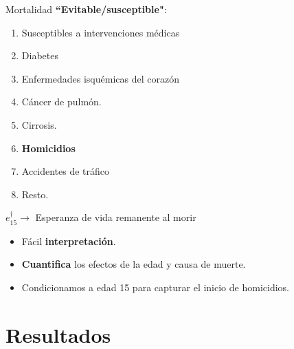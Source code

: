 \documentclass[xcolor={dvipsnames}]{beamer}
\begin{document}
\begin{frame}
\Large{
 Mortalidad \textbf{``Evitable/susceptible"}:
		\begin{enumerate}
		
		
\color{blue} 		\item Susceptibles a intervenciones m\'edicas 
\pause

\color{ForestGreen}		\item Diabetes
		
		\item Enfermedades isqu\'emicas del coraz\'on
		
		\item C\'ancer de pulm\'on.
		
		\item Cirrosis.
		
\pause
		
\color{red}		\item \textbf{Homicidios}
		
\color{yellow}		\item Accidentes de tr\'afico
		
		\pause
		
\color{gray}				\item Resto.

		
		\end{enumerate}			

}
\end{frame}


\begin{frame}

\Large{
\textbf{$e^{\dagger}_{15}\longrightarrow  $ }Esperanza de vida remanente al morir

\begin{itemize}
\item F\'acil  \textbf{interpretaci\'on}.
\pause
\item \textbf{Cuantifica} los efectos de la edad y causa de muerte.
\pause
\item Condicionamos a edad 15 para capturar el inicio de homicidios.
\end{itemize}

}
\end{frame}


\section{Resultados}
\end{document}
